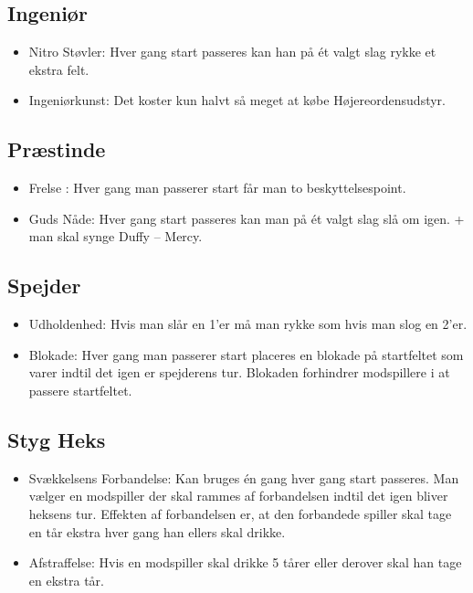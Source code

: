 \documentclass{article}
\begin{document}
\subsection{Ingeniør}
\begin{itemize}
	\item Nitro Støvler: Hver gang start passeres kan han på ét valgt slag rykke et ekstra felt.
	\item Ingeniørkunst: Det koster kun halvt så meget at købe Højereordensudstyr.
\end{itemize}

\subsection{Præstinde}
\begin{itemize}
	\item Frelse : Hver gang man passerer start får man to beskyttelsespoint.
	\item Guds Nåde: Hver gang start passeres kan man på ét valgt slag slå om igen. + man skal synge Duffy – Mercy.
\end{itemize}
 
\subsection{Spejder}
\begin{itemize}
	\item Udholdenhed: Hvis man slår en 1’er må man rykke som hvis man slog en 2’er.
	\item Blokade: Hver gang man passerer start placeres en blokade på startfeltet som varer indtil det igen er spejderens tur. Blokaden forhindrer modspillere i at passere startfeltet.
\end{itemize}
 
\subsection{Styg Heks}
\begin{itemize}
	\item Svækkelsens Forbandelse: Kan bruges én gang hver gang start passeres. Man vælger en modspiller der skal rammes af forbandelsen indtil det igen bliver heksens tur. Effekten af forbandelsen er, at den forbandede spiller skal tage en tår ekstra hver gang han ellers skal drikke.
	\item Afstraffelse: Hvis en modspiller skal drikke 5 tårer eller derover skal han tage en ekstra tår.
\end{itemize}
 
\end{document}
